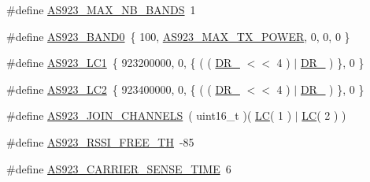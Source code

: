 \begin{DoxyCompactItemize}
\item 
\#define \mbox{\hyperlink{group___r_e_g_i_o_n_a_s923_ga462d2371d2b936331d37530925ffb66d}{A\+S923\+\_\+\+M\+A\+X\+\_\+\+N\+B\+\_\+\+B\+A\+N\+DS}}~1
\item 
\#define \mbox{\hyperlink{group___r_e_g_i_o_n_a_s923_ga78d5e5197f4e58d1e45290a300e86a2b}{A\+S923\+\_\+\+B\+A\+N\+D0}}~\{ 100, \mbox{\hyperlink{group___r_e_g_i_o_n_a_s923_ga572944e6a8933722a954e4cee98fa0ee}{A\+S923\+\_\+\+M\+A\+X\+\_\+\+T\+X\+\_\+\+P\+O\+W\+ER}}, 0, 0, 0 \}
\item 
\#define \mbox{\hyperlink{group___r_e_g_i_o_n_a_s923_gad552f8b259e81215d17bfd1f9c0f1198}{A\+S923\+\_\+\+L\+C1}}~\{ 923200000, 0, \{ ( ( \mbox{\hyperlink{group___r_e_g_i_o_n_ga872e12c82020c02a7f70a1c6ed1375df}{D\+R\+\_}} $<$$<$ 4 ) $\vert$ \mbox{\hyperlink{group___r_e_g_i_o_n_ga6c4ef966b4f3d5eb7597b087f2b97095}{D\+R\+\_}} ) \}, 0 \}
\item 
\#define \mbox{\hyperlink{group___r_e_g_i_o_n_a_s923_gae6a0cfa9079c4ab3097ac797506452d4}{A\+S923\+\_\+\+L\+C2}}~\{ 923400000, 0, \{ ( ( \mbox{\hyperlink{group___r_e_g_i_o_n_ga872e12c82020c02a7f70a1c6ed1375df}{D\+R\+\_}} $<$$<$ 4 ) $\vert$ \mbox{\hyperlink{group___r_e_g_i_o_n_ga6c4ef966b4f3d5eb7597b087f2b97095}{D\+R\+\_}} ) \}, 0 \}
\item 
\#define \mbox{\hyperlink{group___r_e_g_i_o_n_a_s923_ga56d14306ed1af83973ff240658721a24}{A\+S923\+\_\+\+J\+O\+I\+N\+\_\+\+C\+H\+A\+N\+N\+E\+LS}}~( uint16\+\_\+t )( \mbox{\hyperlink{group___r_e_g_i_o_n_ga12fa17e5c1016e01a9d82c25027deb1b}{LC}}( 1 ) $\vert$ \mbox{\hyperlink{group___r_e_g_i_o_n_ga12fa17e5c1016e01a9d82c25027deb1b}{LC}}( 2 ) )
\item 
\#define \mbox{\hyperlink{group___r_e_g_i_o_n_a_s923_gabcc79c4eb4e2717692ac348885e3139f}{A\+S923\+\_\+\+R\+S\+S\+I\+\_\+\+F\+R\+E\+E\+\_\+\+TH}}~-\/85
\item 
\#define \mbox{\hyperlink{group___r_e_g_i_o_n_a_s923_ga6c93e3596e26eb72247906ee33523404}{A\+S923\+\_\+\+C\+A\+R\+R\+I\+E\+R\+\_\+\+S\+E\+N\+S\+E\+\_\+\+T\+I\+ME}}~6
\end{DoxyCompactItemize}
